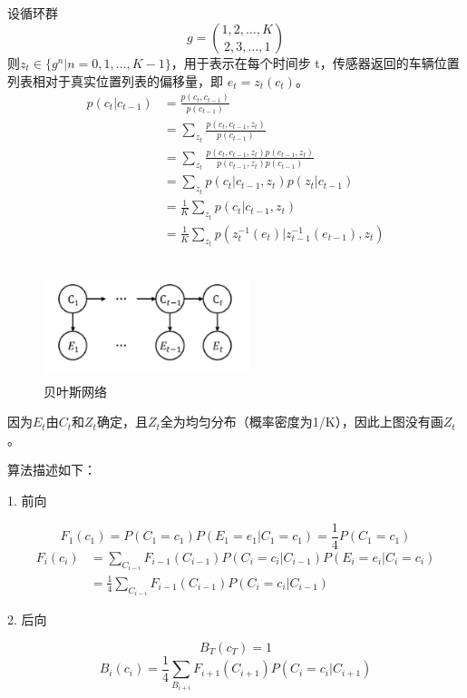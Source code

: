 \documentclass{ctexart}
\begin{document}
	\subsection{}
	设循环群$$g=\binom{1,2,\dots ,K}{2,3,\dots ,1}$$
	则$z_t\in \{g^n|n=0, 1, ..., K-1\}$，用于表示在每个时间步 t，传感器返回的车辆位置列表相对于真实位置列表的偏移量，即
	$e_t=z_t(c_t)$。
	\begin{align*}
	p(c_{t} | c_{t-1}) 
	&=\frac{p(c_{t} ,c_{t-1})}{p(c_{t-1})} \\
	&= \sum\limits_{z_t}\frac{p(c_{t} ,c_{t-1}, z_{t})}{p(c_{t-1})} \\
	&= \sum\limits_{z_t}\frac{p(c_{t} ,c_{t-1}, z_{t})p(c_{t-1}, z_{t})}{p(c_{t-1}, z_{t})p(c_{t-1})}\\
	&= \sum\limits_{z_t} p(c_{t} |c_{t-1}, z_{t})p(z_{t}|c_{t-1})\\
	& =\frac{1}{K}\sum\limits_{z_t} p(c_{t} |c_{t-1}, z_{t})\\
	& =\frac{1}{K}\sum\limits_{z_t} p(z_{t}^{-1}(e_t) |z_{t-1}^{-1}(e_{t-1}), z_{t})
\end{align*}
	\subsection{}
	\begin{figure}[H]
		\centering
		\includegraphics[height=3cm,width=6cm]{3.png}
		\caption{贝叶斯网络}
		\end{figure}
因为$E_t$由$C_t$和$Z_t$确定，且$Z_t$全为均匀分布（概率密度为1/K），因此上图没有画$Z_t$。

算法描述如下：

	1. 前向

	$$F_{1}(c_{1})=P(C_{1}=c_{1})P(E_{1}=e_{1}|C_{1}=c_{1})
	=\frac{1}{4}P(C_{1}=c_{1})$$
	\begin{align*}
	F_{i}(c_{i})&=\sum_{C_{i-i}}F_{i-1}(C_{i-1})P(C_{i}=c_{i}|C_{i-1})P(E_{i}=e_{i}|C_{i}=c_{i})\\
	&=\frac{1}{4}\sum_{C_{i-i}}F_{i-1}(C_{i-1})P(C_{i}=c_{i}|C_{i-1})
	\end{align*}

	2. 后向
	
	$$B_{T}(c_{T})=1$$
	$$B_{i}(c_{i})
	=\frac{1}{4}\sum_{B_{i+i}}F_{i+1}(C_{i+1})P(C_{i}
	=c_{i}|C_{i+1})$$
\end{document}
